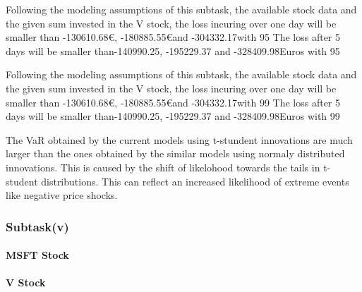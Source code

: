 Following the modeling assumptions of this subtask, the available stock data and the given sum invested in the V stock, the loss incuring over one day will be smaller than -130610.68\euro, -180885.55\euro and -304332.17\euroEuros with 95%
The loss after 5 days will be smaller than-140990.25, -195229.37 and -328409.98Euros with 95%



Following the modeling assumptions of this subtask, the available stock data and the given sum invested in the V stock, the loss incuring over one day will be smaller than -130610.68\euro, -180885.55\euro and -304332.17\euroEuros with 99%
The loss after 5 days will be smaller than-140990.25, -195229.37 and -328409.98Euros with 99%

The VaR obtained by the current models using t-stundent innovations are much larger than the ones obtained by the similar models using normaly distributed innovations. This is caused by the shift of likelohood towards the tails in t-student distributions. This can reflect an increased likelihood of extreme events like negative price shocks.

\subsubsection{Subtask(v)}
\paragraph{MSFT Stock}

\paragraph{V Stock}
